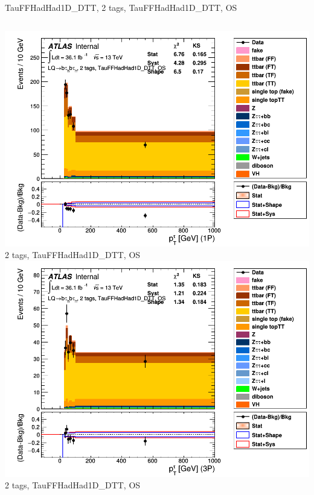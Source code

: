 \begin{frame}{TauFFHadHad1D\_DTT, 2 tags, TauFFHadHad1D\_DTT, OS}
  \begin{columns}[c]
    \centering\includegraphics[width=\textwidth]{C_2tag2pjet_0ptv_OS_TauPt1P}\\
    2 tags, TauFFHadHad1D\_DTT, OS
    \centering\includegraphics[width=\textwidth]{C_2tag2pjet_0ptv_OS_TauPt3P}\\
    2 tags, TauFFHadHad1D\_DTT, OS
  \end{columns}
  \begin{columns}[c]

\end{columns}
\end{frame}
